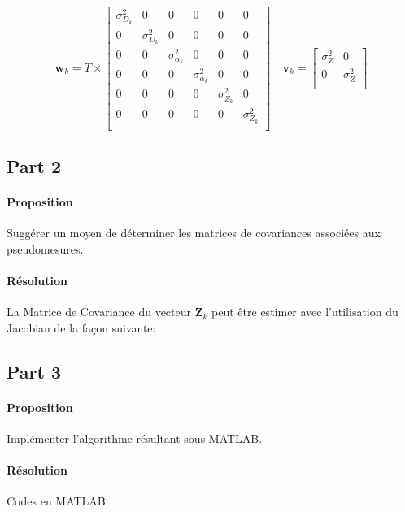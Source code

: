 \documentclass{article}
\begin{document}
\begin{equation}
    \mathbf{w}_{k} = T \times 
    \begin{bmatrix}
        \sigma_{D_{k}}^2 & 0 & 0 & 0 & 0 & 0\\
        0 & \sigma_{D_{k}}^2 & 0 & 0 & 0 & 0\\
        0 & 0 & \sigma_{\alpha_{k}}^2 & 0 & 0 & 0\\
        0 & 0 & 0 & \sigma_{\alpha_{k}}^2 & 0 & 0\\
        0 & 0 & 0 & 0 & \sigma_{Z_{k}}^2 & 0\\
        0 & 0 & 0 & 0 & 0 & \sigma_{Z_{k}}^2\\
    \end{bmatrix}
    \quad
    \mathbf{v}_{k} = 
    \begin{bmatrix}
        \sigma_{Z}^2 & 0\\
        0 & \sigma_{Z}^2\\
    \end{bmatrix}
\end{equation}

\subsection{Part 2}
\paragraph{Proposition}Suggérer un moyen de déterminer les matrices de covariances associées aux pseudomesures.

\paragraph{Résolution}La Matrice de Covariance \cite{jacobianMatrix} \cite{jacobianMatrixComputation} du vecteur $\mathbf{Z}_{k}$ peut être estimer avec l'utilisation du Jacobian de la façon suivante:

\subsection{Part 3}
\paragraph{Proposition}Implémenter l'algorithme résultant sous MATLAB.

\paragraph{Résolution}Codes en MATLAB:
\begin{scriptsize}\mycode
    
\end{scriptsize}
\end{document}
